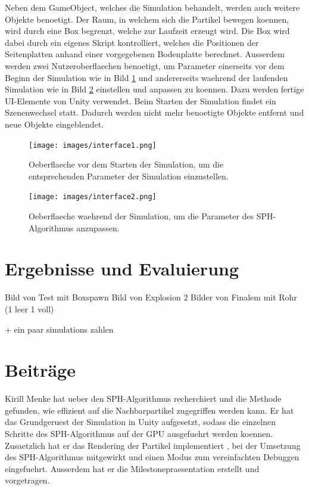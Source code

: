 \documentclass[a4paper]{paper}
\begin{document}
Neben dem GameObject, welches die Simulation behandelt, werden auch weitere Objekte benoetigt. Der Raum, in welchem sich die Partikel bewegen koennen, wird durch eine Box begrenzt, welche zur Laufzeit erzeugt wird. Die Box wird dabei durch ein eigenes Skript kontrolliert, welches die Positionen der Seitenplatten anhand einer vorgegebenen Bodenplatte berechnet.
Ausserdem werden zwei Nutzeroberflaechen benoetigt, um Parameter einerseits vor dem Beginn der Simulation wie in Bild \ref{fig:interface1} und andererseits waehrend der laufenden Simulation wie in Bild \ref{fig:interface2} einstellen und anpassen zu koennen. Dazu werden fertige UI-Elemente von Unity verwendet. Beim Starten der Simulation findet ein Szenenwechsel statt. Dadurch werden nicht mehr benoetigte Objekte entfernt und neue Objekte eingeblendet.

\begin{figure}[t]
    \centering
    \texttt{[image: images/interface1.png]}
    \caption{Oeberflaeche vor dem Starten der Simulation, um die entsprechenden Parameter der Simulation einzustellen.}
    \label{fig:interface1}
\end{figure}

\begin{figure}[t]
    \centering
    \texttt{[image: images/interface2.png]}
    \caption{Oeberflaeche waehrend der Simulation, um die Parameter des SPH-Algorithmus anzupassen.}
    \label{fig:interface2}
\end{figure}

\section{Ergebnisse und Evaluierung}
Bild von Test mit Boxspawn
Bild von Explosion
2 Bilder von Finalem mit Rohr (1 leer 1 voll)

+ ein paar simulations zahlen

\section{Beiträge}
Kirill Menke hat ueber den SPH-Algorithmus recherchiert und die Methode gefunden, wie 
effizient auf die Nachbarpartikel zugegriffen werden kann. Er hat das Grundgeruest der Simulation in Unity aufgesetzt, sodass die einzelnen Schritte des SPH-Algorithmus auf der GPU ausgefuehrt werden koennen. Zusaetzlich hat er das Rendering der Partikel implementiert , bei der Umsetzung des SPH-Algorithmus mitgewirkt und einen Modus zum vereinfachten Debuggen eingefuehrt. Ausserdem hat er die Milestonepraesentation erstellt und vorgetragen. 
\end{document}
